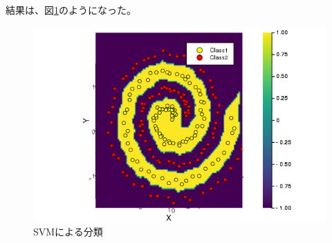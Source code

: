 \documentclass[10pt,a4paper]{ltjsarticle}       %
\begin{document}
結果は、図\ref{fig:svm}のようになった。
\begin{figure}[h]
\begin{center}
\includegraphics[clip, scale=0.8]{svm.png}
\caption{SVMによる分類}
\label{fig:svm}
\end{center}
\end{figure}
\end{document}
